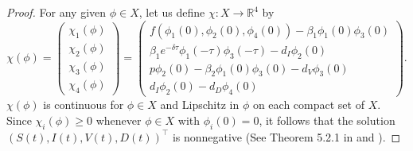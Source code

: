 \documentclass{CMHPhD-SIVD}
\begin{document}
\begin{proof} For any given $\phi\in X$, let us define
	$\chi:X\to\mathbb{R}^4$ by
\begin{equation}\label{38}
     \chi(\phi)=
     \begin{pmatrix}
			 \chi_1(\phi) \\ \chi_2(\phi) \\ \chi_3(\phi) \\ \chi_4(\phi)
		 \end{pmatrix}=
     \begin{pmatrix}
     f(\phi_1(0), \phi_2(0), \phi_4(0))-\beta_1 \phi_1(0)\phi_3(0)\\
      \beta_1 e^{-\delta \tau} \phi_1(-\tau) \phi_3(-\tau) -d_I \phi_2(0)  \\
     p\phi_2(0)-\beta_2 \phi_1(0) \phi_3(0)-d_V \phi_3(0)\\
     d_I \phi_2(0)-d_D \phi_4(0)
     \end{pmatrix}.
\end{equation}
$\chi(\phi)$ is continuous for $\phi\in X$ and Lipschitz in $\phi$ on each compact set of $X$. Since $\chi_i(\phi)\geq0$ whenever $\phi \in X$ with $\phi_i(0) = 0$, it follows that the solution $(S(t), I(t),V(t),D(t))^\top$ is nonnegative (See Theorem 5.2.1 in \cite{smith1995monotone} and \cite{guo2018global}).









\end{proof}
\end{document}
